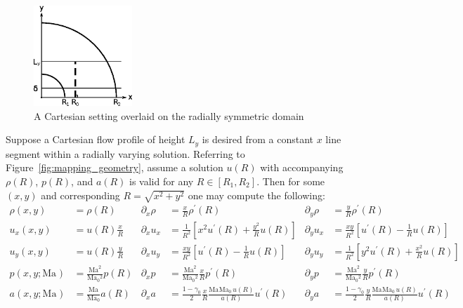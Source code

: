 \documentclass[letterpaper,11pt,nointlimits,reqno]{amsart}
\newcommand{\Mach}[1][]{\mbox{Ma}_{#1}}
\begin{document}
\begin{figure}[h]
  \centering
  \includegraphics[width=0.33\textwidth]{nozzle_schematic}
  \caption{
      \label{fig:mapping_geometry}
      A Cartesian setting overlaid on the radially symmetric domain
  }
\end{figure}
%
Suppose a Cartesian flow profile of height $L_y$ is desired from a constant $x$
line segment within a radially varying solution.
Referring to Figure~\eqref{fig:mapping_geometry}, assume a solution
$u\!\left(R\right)$ with accompanying $\rho\!\left(R\right)$,
$p\!\left(R\right)$, and $a\!\left(R\right)$ is valid for any
$R\in\left[R_1,R_2\right]$.  Then for some $\left(x,y\right)$ and corresponding
$R=\sqrt{x^2+y^2}$ one may compute the following:
%
\begin{align}
              \rho \!\left(x, y\right)        &= \rho\!\left(R\right)
 & \partial_x \rho                            &= \frac{x}{R} \rho^\prime\!\left(R\right)
 & \partial_y \rho                            &= \frac{y}{R} \rho^\prime\!\left(R\right)
\\            u_x  \!\left(x, y\right)        &= u   \!\left(R\right) \frac{x}{R}
 & \partial_x u_x                             &= \frac{1}{R^2}\left[x^2 u^\prime\!\left(R\right) + \frac{y^2}{R} u\!\left(R\right)\right]
 & \partial_y u_x                             &= \frac{xy}{R^2}\left[u^\prime\!\left(R\right) - \frac{1}{R}u\!\left(R\right)\right]
\\            u_y  \!\left(x, y\right)        &= u   \!\left(R\right) \frac{y}{R}
 & \partial_x u_y                             &= \frac{xy}{R^2}\left[u^\prime\!\left(R\right) - \frac{1}{R}u\!\left(R\right)\right]
 & \partial_y u_y                             &= \frac{1}{R^2}\left[y^2 u^\prime\!\left(R\right) + \frac{x^2}{R} u\!\left(R\right)\right]
\\            p    \!\left(x, y; \Mach\right) &= \frac{\Mach^2}{\Mach[0]{}^2} p   \!\left(R\right)
 & \partial_x p                               &= \frac{\Mach^2}{\Mach[0]{}^2}\frac{x}{R} p^\prime\!\left(R\right)
 & \partial_y p                               &= \frac{\Mach^2}{\Mach[0]{}^2}\frac{y}{R} p^\prime\!\left(R\right)
\\            a    \!\left(x, y; \Mach\right) &= \frac{\Mach  }{\Mach[0]{}  } a   \!\left(R\right)
 & \partial_x a                               &= \frac{1-\gamma_0}{2}\frac{x}{R}\frac{\Mach{}\Mach[0]{}\,u\!\left(R\right)}{a\!\left(R\right)} u^\prime\!\left(R\right)
 & \partial_y a                               &= \frac{1-\gamma_0}{2}\frac{y}{R}\frac{\Mach{}\Mach[0]{}\,u\!\left(R\right)}{a\!\left(R\right)} u^\prime\!\left(R\right)
\end{align}
\end{document}
